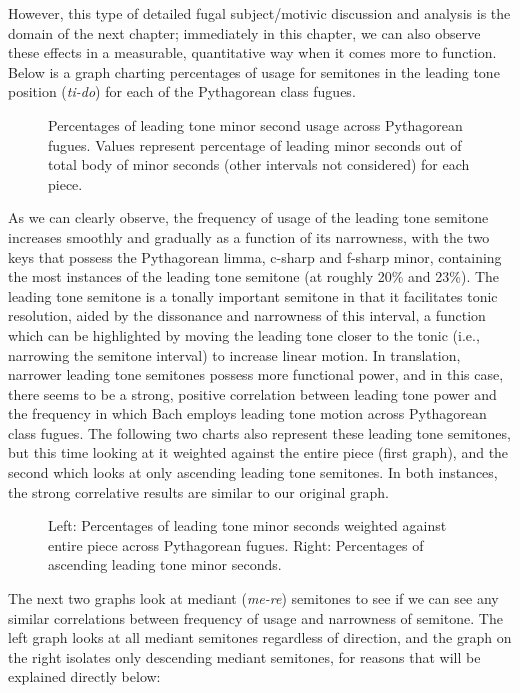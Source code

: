 However, this type of detailed fugal subject/motivic discussion and
analysis is the domain of the next chapter; immediately in this chapter,
we can also observe these effects in a measurable, quantitative way when
it comes more to function. Below is a graph charting percentages of
usage for semitones in the leading tone position (\emph{ti-do}) for each
of the Pythagorean class fugues.




\begin{figure}[H]
\vspace{1.5em}
    \centering
    \caption[Percentages of leading tone minor second usage across Pythagorean fugues. ]{Percentages of leading tone minor second usage across Pythagorean fugues. Values represent percentage of leading minor seconds out of total body of minor seconds (other intervals not considered) for each piece.}
\end{figure}    As we can clearly observe, the frequency of usage of the leading tone
semitone increases smoothly and gradually as a function of its
narrowness, with the two keys that possess the Pythagorean limma,
c-sharp and f-sharp minor, containing the most instances of the leading
tone semitone (at roughly 20\% and 23\%). The leading tone semitone is a
tonally important semitone in that it facilitates tonic resolution,
aided by the dissonance and narrowness of this interval, a function
which can be highlighted by moving the leading tone closer to the tonic
(i.e., narrowing the semitone interval) to increase linear motion. In
translation, narrower leading tone semitones possess more functional
power, and in this case, there seems to be a strong, positive
correlation between leading tone power and the frequency in which Bach
employs leading tone motion across Pythagorean class fugues. The
following two charts also represent these leading tone semitones, but
this time looking at it weighted against the entire piece (first graph),
and the second which looks at only ascending leading tone semitones. In
both instances, the strong correlative results are similar to our
original graph.



\begin{figure}[H]
\vspace{1.5em}
    \centering
    \caption[Percentages of leading tone minor seconds weighted against entire piece, and percentages of ascending leading tone minor seconds across Pythagorean fugues. ]{Left: Percentages of leading tone minor seconds weighted against entire piece across Pythagorean fugues. Right: Percentages of ascending leading tone minor seconds.}
\end{figure}    The next two graphs look at mediant (\emph{me-re}) semitones to see if
we can see any similar correlations between frequency of usage and
narrowness of semitone. The left graph looks at all mediant semitones
regardless of direction, and the graph on the right isolates only
descending mediant semitones, for reasons that will be explained
directly below:



